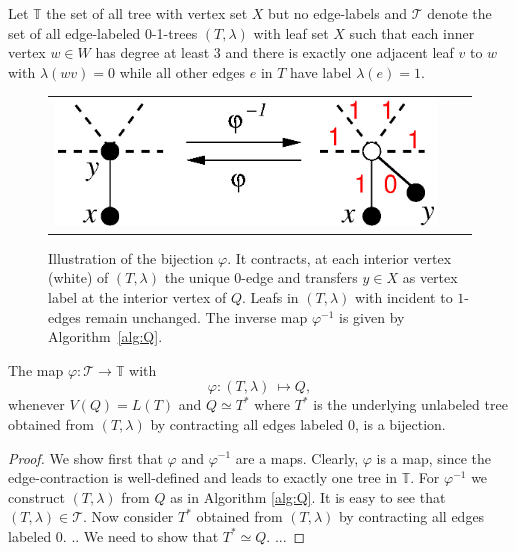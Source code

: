 \documentclass[smallextended]{svjour3}
\newcommand{\rev}[1]{\begingroup\color{blue}#1\endgroup}
\begin{document}
Let $\mathbb{T}$ the set of all tree with vertex set $X$ but no edge-labels
and $\mathcal{T}$ denote the set of all edge-labeled 0-1-trees $(T,\lambda)$ with
leaf set $X$ such that each inner vertex $w\in W$ has degree at least $3$ and 
there is exactly one adjacent leaf $v$ to $w$ with $\lambda(wv)=0$ 
while all other edges $e$ in $T$ have label $\lambda(e)=1$. 

\begin{figure}
\begin{tabular}{lcr}
\begin{minipage}{0.5\textwidth}
\begin{center}
\includegraphics[width=\textwidth]{bijection.eps}
\end{center} 
\end{minipage} & & 
\begin{minipage}{0.4\textwidth}
  \caption{\rev{Illustration of the bijection $\varphi$. It contracts, at
      each interior vertex (white) of $(T,\lambda)$ the unique $0$-edge and
      transfers $y\in X$ as vertex label at the interior vertex of $Q$.
      Leafs in $(T,\lambda)$ with incident to $1$-edges remain unchanged.
      The inverse map $\varphi^{-1}$ is given by Algorithm~\ref{alg:Q}.}}
  \label{fig:bijection}
\end{minipage}
\end{tabular}
\end{figure}

\rev{
\begin{lemma}
	The map  $\varphi : \mathcal{T} \to  \mathbb{T}$ with \[\varphi: (T,\lambda)\ \mapsto Q, \] whenever
	$V(Q)=L(T)$ and  
	$Q\simeq T^*$ where $T^*$ is the underlying unlabeled tree obtained from $(T,\lambda)$ by 
	contracting all edges labeled $0$, is a bijection.
	\label{lem:bijection}
\end{lemma}
\begin{proof}
	We show first that $\varphi$ and $\varphi^{-1}$ are a maps.  
	Clearly, $\varphi$ is a map, since the edge-contraction 
	is well-defined and leads to exactly one tree in $\mathbb{T}$. 
	For $\varphi^{-1}$ we construct $(T,\lambda)$ from $Q$
	as in Algorithm \ref{alg:Q}. 
	It is easy to see that  $(T,\lambda) \in  \mathcal{T}$. 
	Now consider $T^*$ obtained from  $(T,\lambda)$ by 
	contracting all edges labeled $0$. .. We need to show that 
	$T^* \simeq Q$.  ... 
 	
\end{proof}
}
\end{document}
